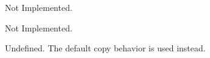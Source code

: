 \begin{DoxyRefList}
%
Not Implemented.  
\item[Member \mbox{\hyperlink{a01199_a890e0f6603eca56c4c70772d5b559d53}{HF\+::Spatial\+Structures\+::Graph\+::Generate\+Energy}} ()]\label{a00263__deprecated000023}%
%
Not Implemented.  
\item[Member \mbox{\hyperlink{a01203_a5a3306ea1b8904361b038391718ccc07}{HF\+::Spatial\+Structures\+::Node\+::operator=}} (const std\+::array$<$ float, 3 $>$ \&n2)]\label{a00263__deprecated000024}%
%
Undefined. The default copy behavior is used instead. 
\end{DoxyRefList}
